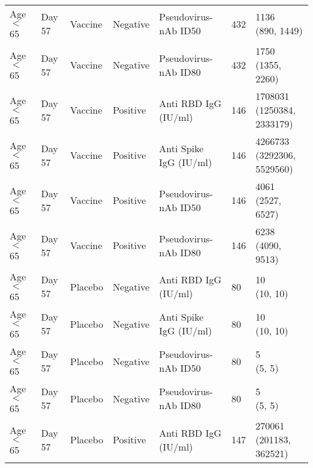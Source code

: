 \documentclass[]{book}
\theoremstyle{definition}
\theoremstyle{definition}
\theoremstyle{definition}
\newcommand{\1}{\mathbbm{1}}
\begin{document}
\begin{landscape}
\begin{ThreePartTable}
\begin{longtable}[t]{>{\raggedright\arraybackslash}p{7cm}llllll}
\hspace{1em}Age $<$ 65 & Day 57 & Vaccine & Negative & Pseudovirus-nAb ID50 & 432 & \makecell[l]{1136\\(890, 1449)}\\
\hspace{1em}Age $<$ 65 & Day 57 & Vaccine & Negative & Pseudovirus-nAb ID80 & 432 & \makecell[l]{1750\\(1355, 2260)}\\
\hspace{1em}Age $<$ 65 & Day 57 & Vaccine & Positive & Anti RBD IgG (IU/ml) & 146 & \makecell[l]{1708031\\(1250384, 2333179)}\\
\hspace{1em}Age $<$ 65 & Day 57 & Vaccine & Positive & Anti Spike IgG (IU/ml) & 146 & \makecell[l]{4266733\\(3292306, 5529560)}\\
\hspace{1em}Age $<$ 65 & Day 57 & Vaccine & Positive & Pseudovirus-nAb ID50 & 146 & \makecell[l]{4061\\(2527, 6527)}\\
\hspace{1em}Age $<$ 65 & Day 57 & Vaccine & Positive & Pseudovirus-nAb ID80 & 146 & \makecell[l]{6238\\(4090, 9513)}\\
\hspace{1em}Age $<$ 65 & Day 57 & Placebo & Negative & Anti RBD IgG (IU/ml) & 80 & \makecell[l]{10\\(10, 10)}\\
\hspace{1em}Age $<$ 65 & Day 57 & Placebo & Negative & Anti Spike IgG (IU/ml) & 80 & \makecell[l]{10\\(10, 10)}\\
\hspace{1em}Age $<$ 65 & Day 57 & Placebo & Negative & Pseudovirus-nAb ID50 & 80 & \makecell[l]{5\\(5, 5)}\\
\hspace{1em}Age $<$ 65 & Day 57 & Placebo & Negative & Pseudovirus-nAb ID80 & 80 & \makecell[l]{5\\(5, 5)}\\
\hspace{1em}Age $<$ 65 & Day 57 & Placebo & Positive & Anti RBD IgG (IU/ml) & 147 & \makecell[l]{270061\\(201183, 362521)}\\

\end{longtable}
\end{ThreePartTable}
\end{landscape}
\end{document}

